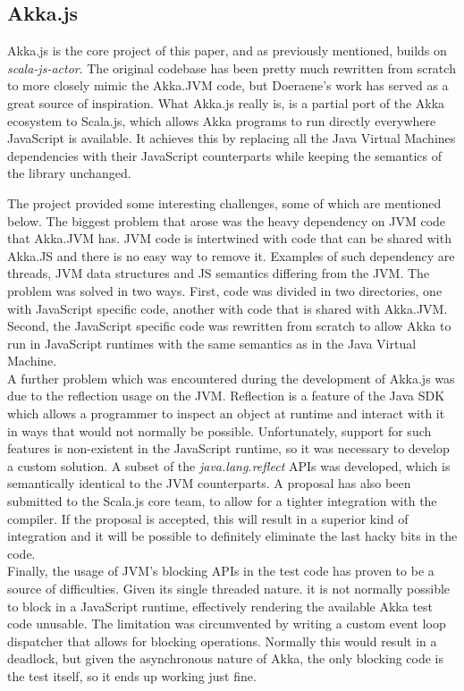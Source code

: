 \documentclass{sig-alternate}
\begin{document}
\subsection{Akka.js}

Akka.js is the core project of this paper, and as previously mentioned, builds on \textit{scala-js-actor}. The original codebase has been pretty much rewritten from scratch to more closely mimic the Akka.JVM code, but Doeraene's work has served as a great source of inspiration.
What Akka.js really is, is a partial port of the Akka ecosystem to Scala.js, which allows Akka programs to run directly everywhere JavaScript is available. It achieves this by replacing all the Java Virtual Machines dependencies with their JavaScript counterparts while keeping the semantics of the library unchanged.

The project provided some interesting challenges, some of which are mentioned below.
The biggest problem that arose was the heavy dependency on JVM code that Akka.JVM has. JVM code is intertwined with code that can be shared with Akka.JS and there is no easy way to remove it. Examples of such dependency are threads, JVM data structures and JS semantics differing from the JVM.
The problem was solved in two ways. First, code was divided in two directories, one with JavaScript specific code, another with code that is shared with Akka.JVM. Second, the JavaScript specific code was rewritten from scratch to allow Akka to run in JavaScript runtimes with the same semantics as in the Java Virtual Machine.
\\
A further problem which was encountered during the development of Akka.js was due to the reflection usage on the JVM. Reflection is a feature of the Java SDK which allows a programmer to inspect an object at runtime and interact with it in ways that would not normally be possible. Unfortunately, support for such features is non-existent in the JavaScript runtime, so it was necessary to develop a custom solution. A subset of the \emph{java.lang.reflect} APIs was developed, which is semantically identical to the JVM counterparts. A proposal has also been submitted to the Scala.js core team, to allow for a tighter integration with the compiler.
If the proposal is accepted, this will result in a superior kind of integration and it will be possible to definitely eliminate the last hacky bits in the code.
\\
Finally, the usage of JVM's blocking APIs in the test code has proven to be a source of difficulties. Given its single threaded nature. it is not normally possible to block in a JavaScript runtime, effectively rendering the available Akka test code unusable. The limitation was circumvented by writing a custom event loop dispatcher that allows for blocking operations. Normally this would result
in a deadlock, but given the asynchronous nature of Akka, the only blocking code is the test itself, so it ends up working just fine.
\end{document}
